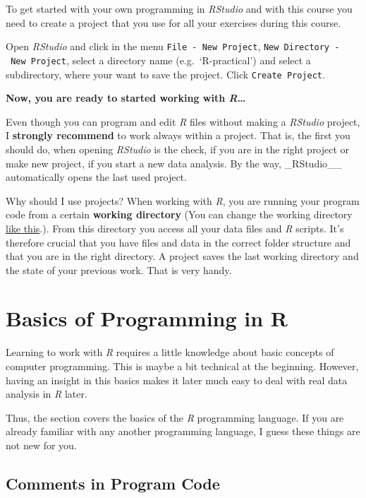 \documentclass[
]{scrartcl}
\makeatletter
\newenvironment{kframe}{%
\medskip{}
\setlength{\fboxsep}{.8em}
 \def\at@end@of@kframe{}%
 \ifinner\ifhmode%
  \def\at@end@of@kframe{\end{minipage}}%
  \begin{minipage}{\columnwidth}%
 \fi\fi%
 \def\FrameCommand##1{\hskip\@totalleftmargin \hskip-\fboxsep
 \colorbox{shadecolor}{##1}\hskip-\fboxsep
     \hskip-\linewidth \hskip-\@totalleftmargin \hskip\columnwidth}%
 \MakeFramed {\advance\hsize-\width
   \@totalleftmargin\z@ \linewidth\hsize
   \@setminipage}}%
 {\par\unskip\endMakeFramed%
 \at@end@of@kframe}
\newenvironment{rmdblock}[1]
  {
  \begin{itemize}
  \renewcommand{\labelitemi}{
    \raisebox{-.7\height}[0pt][0pt]{
      {\setkeys{Gin}{width=3em,keepaspectratio}\texttt{[image: images/\#1]}}
    }
  }
  \setlength{\fboxsep}{1em}
  \begin{kframe}
  \item
  }
  {
  \end{kframe}
  \end{itemize}
  }
\newenvironment{myexercise}
    {\begin{rmdblock}{exercise_green}}
    {\end{rmdblock}}
\makeatother
\begin{document}
To get started with your own programming in \emph{RStudio} and with this course you need to create a project that you use for all your exercises during this course.

\begin{myexercise}
Open \emph{RStudio} and click in the menu
\texttt{File\ -\ New\ Project},
\texttt{New\ Directory\ -\ New\ Project}, select a directory name
(e.g.~`R-practical') and select a subdirectory, where your want to save
the project. Click \texttt{Create\ Project}.
\end{myexercise}

\textbf{Now, you are ready to started working with \emph{R}\ldots{}}

Even though you can program and edit \emph{R} files without making a \emph{RStudio} project, I \textbf{strongly recommend} to work always within a project. That is, the first you should do, when opening \emph{RStudio} is the check, if you are in the right project or make new project, if you start a new data analysis. By the way, \_RStudio\_\_ automatically opens the last used project.

Why should I use projects? When working with \emph{R}, you are running your program code from a certain \textbf{working directory} (You can change the working directory \href{https://www.youtube.com/watch?v=LNw6hzGgyxM}{like this}.). From this directory you access all your data files and \emph{R} scripts. It's therefore crucial that you have files and data in the correct folder structure and that you are in the right directory. A project saves the last working directory and the state of your previous work. That is very handy.

\section{Basics of Programming in R}\label{basics}

Learning to work with \emph{R} requires a little knowledge about basic concepts of computer programming. This is maybe a bit technical at the beginning. However, having an insight in this basics makes it later much easy to deal with real data analysis in \emph{R} later.

Thus, the section covers the basics of the \emph{R} programming language. If you are already familiar with any another programming language, I guess these things are not new for you.

\subsection{Comments in Program Code}\label{comments-in-program-code}
\end{document}
